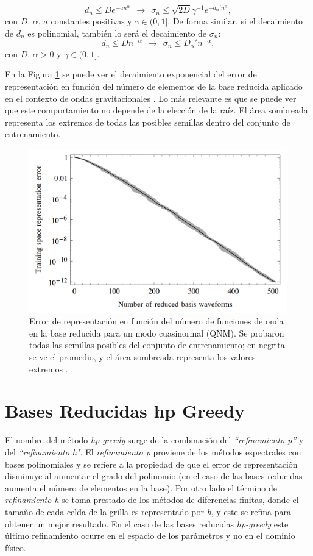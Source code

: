 \[
d_n \leq De^{-an^{\alpha}} \ \ \rightarrow \ \ \sigma_n \leq \sqrt{2D} \gamma^{-1} e^{-a_{\alpha}'n^{\alpha}},
\]
con $D$, $\alpha$, $a$ constantes positivas y $\gamma \in (0,1]$.
De forma similar, si el decaimiento de $d_n$ es polinomial, también lo será el decaimiento de $\sigma_n$:
\[
d_n \leq D n^{-\alpha} \ \ \rightarrow \ \ \sigma_n \leq D_{\alpha}'n^{-\alpha},
\]
con $D$, $\alpha > 0$ y $\gamma \in (0, 1]$.

En la Figura \ref{fig:rb_vs_n} se puede ver el decaimiento exponencial del error de representación en función del número de elementos de la base reducida aplicado en el contexto de ondas gravitacionales \cite{Caudill_2012}. Lo más relevante es que se puede ver que este comportamiento no depende de la elección de la raíz. El área sombreada representa los extremos de todas las posibles semillas dentro del conjunto de entrenamiento.


\begin{figure}[h!]
\centering
\includegraphics[width=.8\columnwidth]{figs/rb_vs_n.png}
\caption{Error de representación en función del número de funciones de onda en la base reducida para un modo cuasinormal (QNM). Se probaron todas las semillas posibles del conjunto de entrenamiento; en negrita se ve el promedio, y el área sombreada representa los valores extremos \cite{Caudill_2012}.}
\label{fig:rb_vs_n}
\end{figure}

\section{Bases Reducidas hp Greedy}

El nombre del método \textit{hp-greedy} \cite{Cerino:2022dhr} surge de la combinación del \textit{``refinamiento p''} y del \textit{``refinamiento h"}. El \textit{refinamiento p} proviene de los métodos espectrales con bases polinomiales \cite{hesthaven_gottlieb_gottlieb_2007} y se refiere a la propiedad de que el error de representación disminuye al aumentar el grado del polinomio (en el caso de las bases reducidas aumenta el número de elementos en la base). Por otro lado el término de \textit{refinamiento h} se toma prestado de los métodos de diferencias finitas, donde el tamaño de cada celda de la grilla es representado por \textit{h}, y este se refina para obtener un mejor resultado. En el caso de las bases reducidas \textit{hp-greedy} este último refinamiento ocurre en el espacio de los parámetros y no en el dominio físico.

